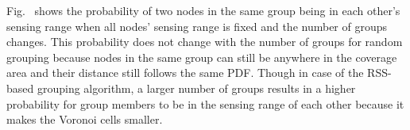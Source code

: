 Fig.~ shows the probability of two nodes in the same group being in each other's sensing range when all nodes' sensing range is fixed and the number of groups changes. This probability does not change with the number of groups for random grouping because nodes in the same group can still be anywhere in the coverage area and their distance still follows the same PDF. Though in case of the RSS-based grouping algorithm, a larger number of groups results in a higher probability for group members to be in the sensing range of each other because it makes the Voronoi cells smaller.    

